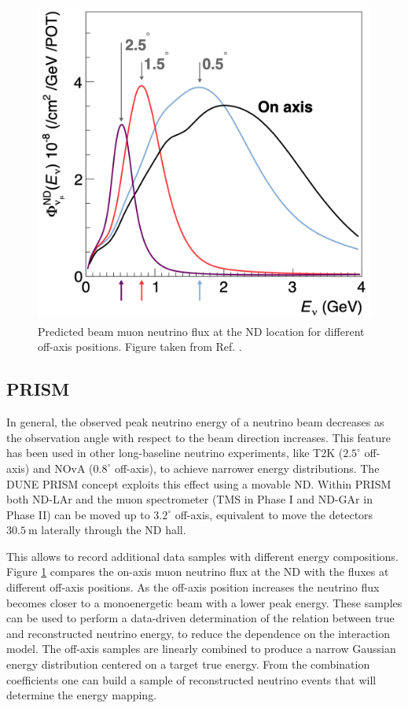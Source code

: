 \begin{figure}[t]
	\centering
	\includegraphics[width=0.55\linewidth]{Images/DUNE/ND/prism_spectra}
	\caption[Predicted beam muon neutrino flux at the ND location for different off-axis positions.]{Predicted beam muon neutrino flux at the ND location for different off-axis positions. Figure taken from Ref. \cite{DUNE2021NDCDR}.}
	\label{fig:dune_prism}
\end{figure}

\subsection{PRISM}

In general, the observed peak neutrino energy of a neutrino beam decreases as the observation angle with respect to the beam direction increases. This feature has been used in other long-baseline neutrino experiments, like T2K ($2.5^{\circ}$ off-axis) and NOvA ($0.8^{\circ}$ off-axis), to achieve narrower energy distributions. The DUNE PRISM concept exploits this effect using a movable ND. Within PRISM both ND-LAr and the muon spectrometer (TMS in Phase I and ND-GAr in Phase II) can be moved up to $3.2^{\circ}$ off-axis, equivalent to move the detectors $30.5~\mathrm{m}$ laterally through the ND hall.

This allows to record additional data samples with different energy compositions. Figure \ref{fig:dune_prism} compares the on-axis muon neutrino flux at the ND with the fluxes at different off-axis positions. As the off-axis position increases the neutrino flux becomes closer to a monoenergetic beam with a lower peak energy. These samples can be used to perform a data-driven determination of the relation between true and reconstructed neutrino energy, to reduce the dependence on the interaction model. The off-axis samples are linearly combined to produce a narrow Gaussian energy distribution centered on a target true energy. From the combination coefficients one can build a sample of reconstructed neutrino events that will determine the energy mapping.

